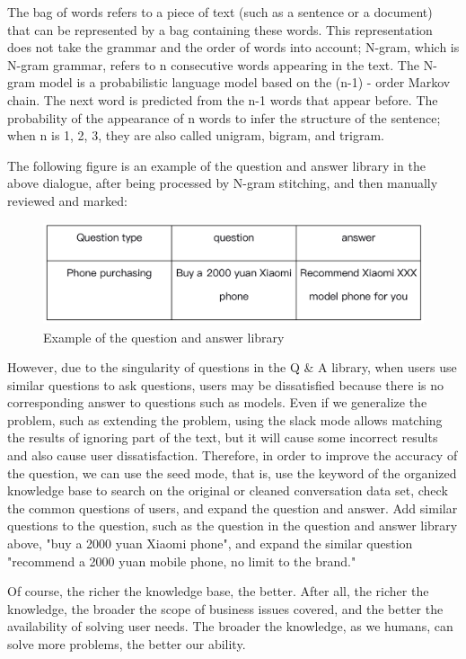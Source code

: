 \documentclass[11pt,en,number]{elegantpaper}
\begin{document}
	The bag of words refers to a piece of text (such as a sentence or a document) that can be represented by a bag containing these words. This representation does not take the grammar and the order of words into account; N-gram, which is N-gram grammar, refers to n consecutive words appearing in the text. The N-gram model is a probabilistic language model based on the (n-1) - order Markov chain. The next word is predicted from the n-1 words that appear before. The probability of the appearance of n words to infer the structure of the sentence; when n is 1, 2, 3, they are also called unigram, bigram, and trigram.
	
	The following figure is an example of the question and answer library in the above dialogue, after being processed by N-gram stitching, and then manually reviewed and marked:
	\begin{figure}[H]
		\centering
		\includegraphics[width=12cm, height=3cm]{KB}
		\caption{Example of the question and answer library}
	\end{figure}
	However, due to the singularity of questions in the Q \& A library, when users use similar questions to ask questions, users may be dissatisfied because there is no corresponding answer to questions such as models. Even if we generalize the problem, such as extending the problem, using the slack mode allows matching the results of ignoring part of the text, but it will cause some incorrect results and also cause user dissatisfaction. Therefore, in order to improve the accuracy of the question, we can use the seed mode, that is, use the keyword of the organized knowledge base to search on the original or cleaned conversation data set, check the common questions of users, and expand the question and answer. Add similar questions to the question, such as the question in the question and answer library above, "buy a 2000 yuan Xiaomi phone", and expand the similar question "recommend a 2000 yuan mobile phone, no limit to the brand."
	
	Of course, the richer the knowledge base, the better. After all, the richer the knowledge, the broader the scope of business issues covered, and the better the availability of solving user needs. The broader the knowledge, as we humans, can solve more problems, the better our ability.
\end{document}
